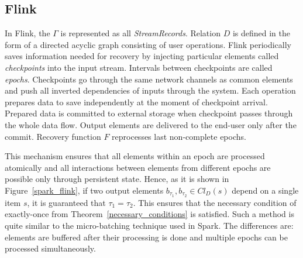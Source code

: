 \subsection{Flink}

In Flink, the  $\Gamma$ is represented as all {\em StreamRecords}. Relation $D$ is defined in the form of a directed acyclic graph consisting of user operations. 
Flink periodically saves information needed for recovery by injecting particular elements called {\em checkpoints} into the input stream. 
Intervals  between checkpoints are called {\em epochs}. Checkpoints go through the same network channels as common elements and push all inverted dependencies of inputs through the system. 
Each operation prepares data to save independently at the moment of checkpoint arrival. Prepared data is committed to external storage when checkpoint passes through the whole data flow. Output elements are delivered to the end-user only after the commit. 
Recovery function $F$ reprocesses last non-complete epochs.

This mechanism ensures that all elements within an epoch are processed atomically and all interactions between elements from different epochs are possible only through persistent state. 
Hence, as it is shown in Figure~\ref{spark_flink},
 if two output elements $b_{\tau_1},b_{\tau_2} \in Cl_D(s)$ depend on a single item $s$, 
 it is guaranteed that $\tau_1=\tau_2$. 
This ensures that the necessary condition of exactly-once from Theorem~\ref{necessary_conditions} is satisfied. 
Such a method is quite similar to the micro-batching technique used in Spark. 
The differences are: elements are buffered after their processing is done and  multiple epochs can be processed simultaneously. 
